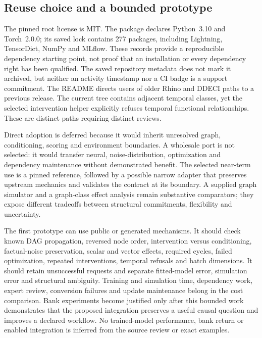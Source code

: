 \subsection{Reuse choice and a bounded prototype}

The pinned root license is MIT. The package declares Python~3.10 and
Torch~2.0.0; its saved lock contains 277 packages, including Lightning,
TensorDict, NumPy and MLflow. These records provide a reproducible dependency
starting point, not proof that an installation or every dependency right has
been qualified. The saved repository metadata does not mark it archived,
but neither an activity timestamp nor a CI badge is a support commitment.
The README directs users of older Rhino and DDECI paths to a previous release.
The current tree contains adjacent temporal classes, yet the selected
intervention helper explicitly refuses temporal functional relationships.
These are distinct paths requiring distinct reviews.
\citep{exec14_causica_primary}

Direct adoption is deferred because it would inherit unresolved graph,
conditioning, scoring and environment boundaries. A wholesale port is not
selected: it would transfer neural, noise-distribution, optimization and
dependency maintenance without demonstrated benefit. The selected near-term
use is a pinned reference, followed by a possible narrow adapter that preserves
upstream mechanics and validates the contract at its boundary. A supplied
graph simulator and a graph-class effect analysis remain substantive
comparators; they expose different tradeoffs between structural commitments,
flexibility and uncertainty. \citep{exec14_causica_decision}

The first prototype can use public or generated mechanisms. It should check
known DAG propagation, reversed node order, intervention versus conditioning,
factual-noise preservation, scalar and vector effects, required cycles, failed
optimization, repeated interventions, temporal refusals and batch dimensions.
It should retain unsuccessful requests and separate fitted-model error,
simulation error and structural ambiguity. Training and simulation time,
dependency work, expert review, conversion failures and update maintenance
belong in the cost comparison. Bank experiments become justified only after
this bounded work demonstrates that the proposed integration preserves a
useful causal question and improves a declared workflow. No trained-model
performance, bank return or enabled integration is inferred from the source
review or exact examples. \citep{exec14_causica_decision}

\label{exec14:causica-contract-end}
